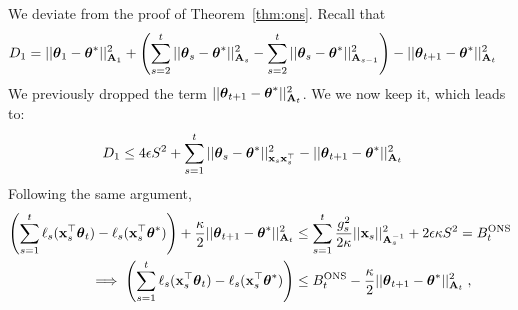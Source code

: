 We deviate from the proof of Theorem~\ref{thm:ons}.
Recall that
\begin{equation*}\begin{aligned}
D_1  &= ||\th_1 - \th^* ||^2_{\A_1} + \lt(\sum_{s=2}^t || \th_s - \th^* ||^2_{\A_s} - \sum_{s=2}^t ||\th_s - \th^*||^2_{\A_{s-1}}\rt) - ||\th_{t+1} - \th^*||^2_{\A_{t}} 
\end{aligned}\end{equation*}
We previously dropped the term $||\th_{t+1} - \th^*||^2_{\A_t}$.
We we now keep it, which leads to:
\begin{equation*}\begin{aligned}
  D_1 &\le  4\eps S^2 + \sum_{s=1}^t ||\th_s-\th^*||^2_{\x_s\x_s^\T} - ||\th_{t+1} - \th^*||^2_{\A_{t}}  
\end{aligned}\end{equation*}
Following the same argument,
\begin{equation*}\begin{aligned}
    \lt(\sum_{s=1}^t \ell_s(\x_s^\T \th_t) - \ell_s(\x_s^\T\th^*) \rt)  + \fr{\kap}{2} ||\th_{t+1} - \th^*||^2_{\A_{t}} 
   &\le \sum_{s=1}^t\fr{g_s^2}{2\kap}||\x_s||^2_{\A_s^{-1}} + 2\eps \kap S^2
    = B_t^{\ONS}
\\\implies  \lt(\sum_{s=1}^t \ell_s(\x_s^\T \th_t) - \ell_s(\x_s^\T\th^*) \rt)   
   &\le B_t^{\ONS} - \fr{\kap}{2} ||\th_{t+1} - \th^*||^2_{\A_{t}}\;,
\end{aligned}\end{equation*}

